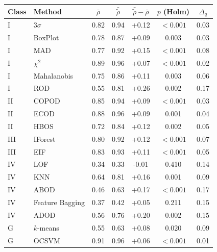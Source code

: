 \begin{tabular}{llccccc}
\hline
\textbf{Class} & \textbf{Method} & $\bar\rho$ & $\bar{\tilde\rho}$ & $\bar{\tilde\rho}-\bar\rho$ & $p$ (Holm) & $\Delta_q$ \\
\hline
I & $3\sigma$ & 0.82 & 0.94 & +0.12 & $<0.001$ & 0.03 \\
I & BoxPlot & 0.78 & 0.87 & +0.09 & 0.003 & 0.03 \\
I & MAD & 0.77 & 0.92 & +0.15 & $<0.001$ & 0.08 \\
I & $\chi^2$ & 0.89 & 0.96 & +0.07 & $<0.001$ & 0.02 \\
I & Mahalanobis & 0.75 & 0.86 & +0.11 & 0.003 & 0.06 \\
I & ROD & 0.55 & 0.81 & +0.26 & 0.002 & 0.17 \\
II & COPOD & 0.85 & 0.94 & +0.09 & $<0.001$ & 0.03 \\
II & ECOD & 0.88 & 0.96 & +0.09 & 0.001 & 0.04 \\
II & HBOS & 0.72 & 0.84 & +0.12 & 0.002 & 0.05 \\
III & IForest & 0.80 & 0.92 & +0.12 & $<0.001$ & 0.07 \\
III & EIF & 0.83 & 0.93 & +0.11 & $<0.001$ & 0.05 \\
IV & LOF & 0.34 & 0.33 & -0.01 & 0.410 & 0.14 \\
IV & KNN & 0.64 & 0.81 & +0.16 & 0.001 & 0.09 \\
IV & ABOD & 0.46 & 0.63 & +0.17 & $<0.001$ & 0.17 \\
IV & Feature Bagging & 0.37 & 0.42 & +0.05 & 0.211 & 0.15 \\
IV & ADOD & 0.56 & 0.76 & +0.20 & 0.002 & 0.15 \\
G & $k$-means & 0.55 & 0.63 & +0.08 & 0.020 & 0.09 \\
G & OCSVM & 0.91 & 0.96 & +0.06 & $<0.001$ & 0.01 \\
\hline
\end{tabular}
